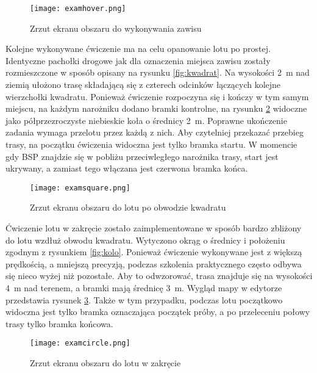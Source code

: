 \begin{figure}[!h]
    \centering \texttt{[image: examhover.png]}
    \caption{Zrzut ekranu obszaru do wykonywania zawisu}
    \label{fig:examhover}
\end{figure}

Kolejne wykonywane ćwiczenie ma na celu opanowanie lotu po prostej. Identyczne pachołki drogowe jak dla oznaczenia miejsca zawisu zostały rozmieszczone w sposób opisany na rysunku \ref{fig:kwadrat}. Na wysokości 2~m nad ziemią ułożono trasę składającą się z czterech odcinków łączących kolejne wierzchołki kwadratu. Ponieważ ćwiczenie rozpoczyna się i kończy w tym samym miejscu, na każdym narożniku dodano bramki kontrolne, na rysunku \ref{fig:examsquare} widoczne jako półprzezroczyste niebieskie koła o średnicy 2~m. Poprawne ukończenie zadania wymaga przelotu przez każdą z nich. Aby czytelniej przekazać przebieg trasy, na początku ćwiczenia widoczna jest tylko bramka startu. W momencie gdy BSP znajdzie się w pobliżu przeciwległego narożnika trasy, start jest ukrywany, a zamiast tego włączana jest czerwona bramka końca.

\begin{figure}[!h]
    \centering \texttt{[image: examsquare.png]}
    \caption{Zrzut ekranu obszaru do lotu po obwodzie kwadratu}
    \label{fig:examsquare}
\end{figure}

Ćwiczenie lotu w zakręcie zostało zaimplementowane w sposób bardzo zbliżony do lotu wzdłuż obwodu kwadratu. Wytyczono okrąg o średnicy i położeniu zgodnym z rysunkiem \ref{fig:kolo}. Ponieważ ćwiczenie wykonywane jest z większą prędkością, a mniejszą precyzją, podczas szkolenia praktycznego często odbywa się nieco wyżej niż pozostałe. Aby to odwzorować, trasa znajduje się na wysokości 4~m nad terenem, a bramki mają średnicę 3~m. Wygląd mapy w edytorze przedstawia rysunek \ref{fig:examcircle}. Także w tym przypadku, podczas lotu początkowo widoczna jest tylko bramka oznaczająca początek próby, a po przeleceniu połowy trasy tylko bramka końcowa.

\begin{figure}[!h]
    \centering \texttt{[image: examcircle.png]}
    \caption{Zrzut ekranu obszaru do lotu w zakręcie}
    \label{fig:examcircle}
\end{figure}

